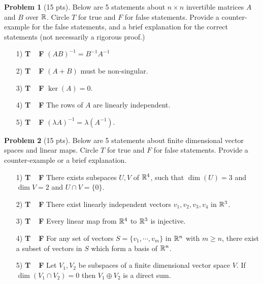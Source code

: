 \documentclass[12pt]{amsart}
\theoremstyle{definition}
\newtheorem{prob}{Problem}
\begin{document}
\begin{prob}[15 pts]
	Below are 5 statements about $n\times n$ invertible matrices $A$ and $B$ over $\mathbb{R}$. Circle $T$ for true and $F$ for false statements. Provide a counter-example for the false statements, and a brief explanation for the correct statements (not necessarily a rigorous proof.) \begin{enumerate}
	\item[1)  {\bf T\ \  F}]\quad $(AB)^{-1}=B^{-1}A^{-1}$
	
	\vspace{3cm}
	\item[2)  {\bf T\ \  F}]\quad  $(A+B)$ must be non-singular. \vspace{4cm}
	\item[3)  {\bf T\ \  F}]\quad $\ker(A)=0$. \vspace{4cm}
	\item[4)  {\bf T\ \  F}]\quad The rows of $A$ are linearly independent. \vspace{4cm}
	\item[5)  {\bf T\ \  F}]\quad $(\lambda A)^{-1}=\lambda (A^{-1})$.
\end{enumerate}
\end{prob}
\newpage
\begin{prob}[15 pts]
	Below are 5 statements about finite dimensional vector spaces and linear maps. Circle $T$ for true and $F$ for false statements. Provide a counter-example or a brief explanation.
	\begin{enumerate}
		\item[1)  {\bf T\ \  F}]\quad There exists subspaces $U,V$ of $\mathbb{R}^4$, such that $\dim(U)=3$ and $\dim V=2$ and $U\cap V=\{0\}$. 
		\vspace{4cm}
		\item[2)  {\bf T\ \  F}]\quad  There exist linearly independent vectors $v_1,v_2,v_3,v_4$ in $\mathbb{R}^3$.
		\vspace{4cm}
\item[3)  {\bf T\ \  F}]\quad  Every linear map from $\mathbb{R}^4$ to $\mathbb{R}^3$ is injective.\vspace{4cm}
\item[4)  {\bf T\ \  F}]\quad  For any set of vectors $S=\{v_1,\cdots,v_m\}$ in $\mathbb{R}^n$ with $m\geq n$, there exist a subset of vectors in $S$ which form a basis of $\mathbb{R}^n$.\vspace{4cm}
\item[5)  {\bf T\ \  F}]\quad  Let $V_1,V_2$ be subspaces of a finite dimensional vector space $V$. If $\dim(V_1\cap V_2)=0$ then $V_1\oplus V_2$ is a direct sum.
	\end{enumerate}
\end{prob}
\newpage
\end{document}
